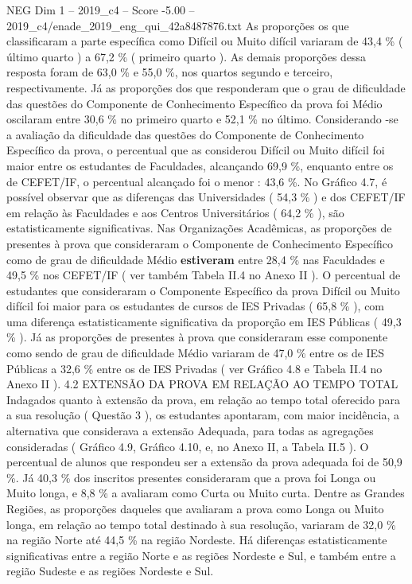 \begin{textsample}{NEG Dim 1 – 2019\_c4 – Score -5.00 – 2019\_c4/enade\_2019\_eng\_qui\_42a8487876.txt}
As proporções os que classificaram a parte específica como Difícil ou Muito difícil variaram de 43,4 \% ( último quarto ) a 67,2 \% ( primeiro quarto ).
As demais proporções dessa resposta foram de 63,0 \% e 55,0 \%, nos quartos segundo e terceiro, respectivamente.
Já as proporções dos que responderam que o grau de dificuldade das questões do Componente de Conhecimento Específico da prova foi Médio oscilaram entre 30,6 \% no primeiro quarto e 52,1 \% no último.
Considerando -se a avaliação da dificuldade das questões do Componente de Conhecimento Específico da prova, o percentual que as considerou Difícil ou Muito difícil foi maior entre os estudantes de Faculdades, alcançando 69,9 \%, enquanto entre os de CEFET/IF, o percentual alcançado foi o menor : 43,6 \%.
No Gráfico 4.7, é possível observar que as diferenças das Universidades ( 54,3 \% ) e dos CEFET/IF em relação às Faculdades e aos Centros Universitários ( 64,2 \% ), são estatisticamente significativas.
Nas Organizações Acadêmicas, as proporções de presentes à prova que consideraram o Componente de Conhecimento Específico como de grau de dificuldade Médio \textbf{estiveram} entre 28,4 \% nas Faculdades e 49,5 \% nos CEFET/IF ( ver também Tabela II.4 no Anexo II ).
O percentual de estudantes que consideraram o Componente Específico da prova Difícil ou Muito difícil foi maior para os estudantes de cursos de IES Privadas ( 65,8 \% ), com uma diferença estatisticamente significativa da proporção em IES Públicas ( 49,3 \% ).
Já as proporções de presentes à prova que consideraram esse componente como sendo de grau de dificuldade Médio variaram de 47,0 \% entre os de IES Públicas a 32,6 \% entre os de IES Privadas ( ver Gráfico 4.8 e Tabela II.4 no Anexo II ). 4.2 EXTENSÃO DA PROVA EM RELAÇÃO AO TEMPO TOTAL Indagados quanto à extensão da prova, em relação ao tempo total oferecido para a sua resolução ( Questão 3 ), os estudantes apontaram, com maior incidência, a alternativa que considerava a extensão Adequada, para todas as agregações consideradas ( Gráfico 4.9, Gráfico 4.10, e, no Anexo II, a Tabela II.5 ).
O percentual de alunos que respondeu ser a extensão da prova adequada foi de 50,9 \%.
Já 40,3 \% dos inscritos presentes consideraram que a prova foi Longa ou Muito longa, e 8,8 \% a avaliaram como Curta ou Muito curta.
Dentre as Grandes Regiões, as proporções daqueles que avaliaram a prova como Longa ou Muito longa, em relação ao tempo total destinado à sua resolução, variaram de 32,0 \% na região Norte até 44,5 \% na região Nordeste.
Há diferenças estatisticamente significativas entre a região Norte e as regiões Nordeste e Sul, e também entre a região Sudeste e as regiões Nordeste e Sul.

\end{textsample}
